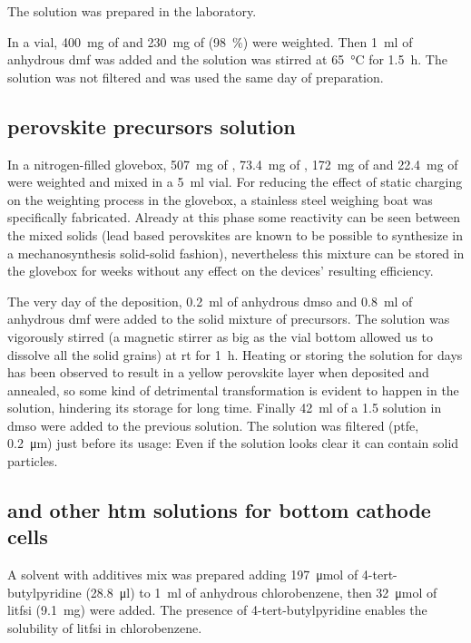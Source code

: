 		The solution was prepared in the laboratory.

		In a vial, \SI{400}{\mg} of  and \SI{230}{\mg} of \PbCltwo (98~\%) were weighted. Then \SI{1}{\ml} of anhydrous \gls{dmf} was added and the solution was stirred at \SI{65}{\celsius} for \SI{1.5}{\hour}. The solution was not filtered and was used the same day of preparation.

	\subsection{ perovskite precursors solution}\label{precursors_csfamapbibr}

		In a nitrogen-filled glovebox, \SI{507}{\mg} of \PbItwo, \SI{73.4}{\mg} of \PbBrtwo, \SI{172}{\mg} of  and \SI{22.4}{\mg} of  were weighted and mixed in a \SI{5}{\ml} vial. For reducing the effect of static charging on the weighting process in the glovebox, a stainless steel weighing boat was specifically fabricated. Already at this phase some reactivity can be seen between the mixed solids (lead based perovskites are known to be possible to synthesize in a mechanosynthesis solid-solid fashion), nevertheless this mixture can be stored in the glovebox for weeks without any effect on the devices' resulting efficiency.

		The very day of the deposition, \SI{0.2}{\ml} of anhydrous \gls{dmso} and \SI{0.8}{\ml} of anhydrous \gls{dmf} were added to the solid mixture of precursors. The solution was vigorously stirred (a magnetic stirrer as big as the vial bottom allowed us to dissolve all the solid grains) at \gls{rt} for \SI{1}{\hour}. Heating or storing the solution for days has been observed to result in a yellow perovskite layer when deposited and annealed, so some kind of detrimental transformation is evident to happen in the solution, hindering its storage for long time. Finally \SI{42}{\ml} of
		a \SI{1.5}{\Molar} \CsI solution in \gls{dmso} were added to the previous solution. The solution was filtered (\gls{ptfe}, \SI{0.2}{\um}) just before its usage: Even if the solution looks clear it can contain solid particles.

	\subsection{\Spiro and other \gls{htm} solutions for bottom cathode cells}

		A solvent with additives mix was prepared adding \SI{197}{\umol} of 4-tert-butylpyridine (\SI{28.8}{\ul}) to \SI{1}{\ml} of anhydrous chlorobenzene, then \SI{32}{\umol} of \gls{litfsi} (\SI{9.1}{\mg}) were added. The presence of 4-tert-butylpyridine enables the solubility of \gls{litfsi} in chlorobenzene.


